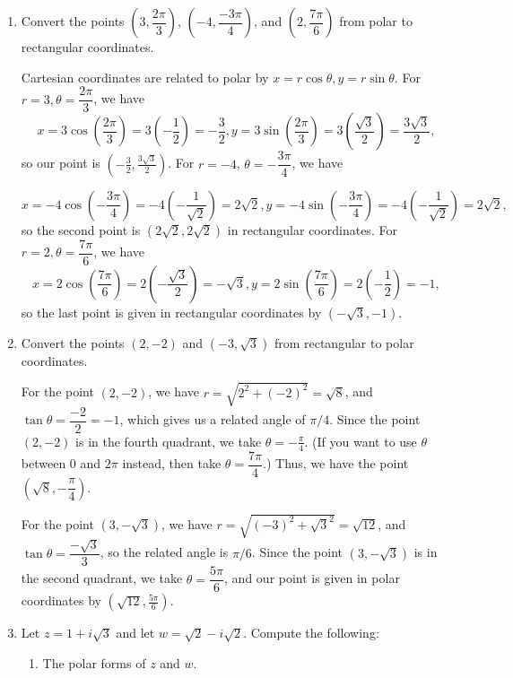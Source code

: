 \documentclass[12pt]{article}
\begin{document}
\begin{enumerate}
\item Convert the points $\left(3,\dfrac{2\pi}{3}\right)$, $\left(-4,\dfrac{-3\pi}{4}\right)$, and $\left(2, \dfrac{7\pi}{6}\right)$ from polar to rectangular coordinates.

\medskip

Cartesian coordinates are related to polar by $x=r\cos\theta, y=r\sin\theta$. For $r=3, \theta = \dfrac{2\pi}{3}$, we have
\[
 x=3\cos\left(\frac{2\pi}{3}\right) = 3\left(-\frac{1}{2}\right) = -\frac{3}{2}, y = 3\sin\left(\frac{2\pi}{3}\right) = 3\left(\frac{\sqrt{3}}{2}\right) = \frac{3\sqrt{3}}{2},
\]
so our point is $\left(-\frac{3}{2}, \frac{3\sqrt{3}}{2}\right)$. For $r=-4$, $\theta = -\dfrac{3\pi}{4}$, we have

\[
 x = -4\cos\left(-\frac{3\pi}{4}\right) = -4\left(-\frac{1}{\sqrt{2}}\right) = 2\sqrt{2}, y = -4\sin\left(-\frac{3\pi}{4}\right) = -4\left(-\frac{1}{\sqrt{2}}\right) = 2\sqrt{2},
\]
so the second point is $(2\sqrt{2},2\sqrt{2})$ in rectangular coordinates. For $r=2, \theta = \dfrac{7\pi}{6}$, we have
\[
 x = 2\cos\left(\frac{7\pi}{6}\right) = 2\left(-\frac{\sqrt{3}}{2}\right) = -\sqrt{3}, y = 2\sin\left(\frac{7\pi}{6}\right) = 2\left(-\frac{1}{2}\right) = -1,
\]
so the last point is given in rectangular coordinates by $(-\sqrt{3}, -1)$.

\medskip

\item Convert the points $(2,-2)$ and $(-3, \sqrt{3})$ from rectangular to polar coordinates.

\medskip

For the point $(2,-2)$, we have $r = \sqrt{2^2+(-2)^2} = \sqrt{8}$, and $\tan\theta = \dfrac{-2}{2} = -1$, which gives us a related angle of $\pi/4$. Since the point $(2,-2)$ is in the fourth quadrant, we take $\theta = -\frac{\pi}{4}$. (If you want to use $\theta$ between $0$ and $2\pi$ instead, then take $\theta = \dfrac{7\pi}{4}$.) Thus, we have the point $\left(\sqrt{8},-\dfrac{\pi}{4}\right)$.

For the point $(3,-\sqrt{3})$, we have $r=\sqrt{(-3)^2+\sqrt{3}^2} = \sqrt{12}$, and $\tan\theta = \dfrac{-\sqrt{3}}{3}$, so the related angle is $\pi/6$. Since the point $(3,-\sqrt{3})$ is in the second quadrant, we take $\theta = \dfrac{5\pi}{6}$, and our point is given in polar coordinates by $\left(\sqrt{12},\frac{5\pi}{6}\right)$.

\medskip
 
 \item Let $z = 1+i\sqrt{3}$ and let $w = \sqrt{2}-i\sqrt{2}$. Compute the following:
\begin{enumerate}
 \item The polar forms of $z$ and $w$.


\end{enumerate}
\end{enumerate}
\end{document}
